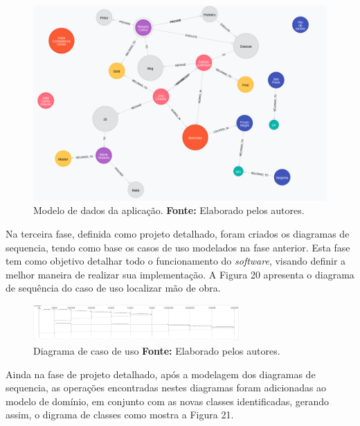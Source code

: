 \begin{figure}[h!]
	\centerline{\includegraphics[scale=0.5]{./imagens/structure-all-nodes.png}}
	\caption[Modelo de dados da aplicação]
	{Modelo de dados da aplicação. \textbf{Fonte:} Elaborado pelos autores.}
	\label{fig:exemplo1}
\end{figure} 


\par Na terceira fase, definida como projeto detalhado, foram criados os diagramas de sequencia, tendo como base os casos de uso modelados na fase anterior. Esta fase tem como objetivo detalhar todo o funcionamento do \textit{software}, visando definir a melhor maneira de realizar sua implementação. A Figura 20 apresenta o diagrama de sequência do caso de uso localizar mão de obra.

\newpage
\begin{figure}[h!]
	\centerline{\includegraphics[angle=90,height=0.7\textheight,width=0.7\textwidth]{./imagens/sequence-localizar-mao-de-obra.png}}
	\caption[Diagrama de caso de uso]
	{Diagrama de caso de uso \textbf{Fonte:} Elaborado pelos autores.}
	\label{fig:exemplo1}
\end{figure}

\par Ainda na fase de projeto detalhado, após a modelagem dos diagramas de sequencia, as operações encontradas nestes diagramas foram adicionadas ao modelo de domínio, em conjunto com as novas classes identificadas, gerando assim, o digrama de classes como mostra a Figura 21.

